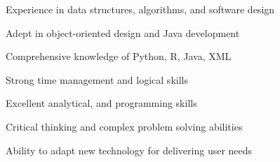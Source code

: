 

\begin{cventries}
	\cventry
	{}{}{}{}
	  {
		\begin{cvitems}
		  \item{Experience in data structures, algorithms, and software design} %
		  \item{Adept in object-oriented design and Java development} %
		  \item{Comprehensive knowledge of Python, R, Java, XML}
		  \item{Strong time management and logical skills}
		  \item{Excellent analytical, and programming skills}
		  \item{Critical thinking and complex problem solving abilities}
		  \item{Ability to adapt new technology for delivering user needs}
		\end{cvitems}
	  }
\end{cventries}
